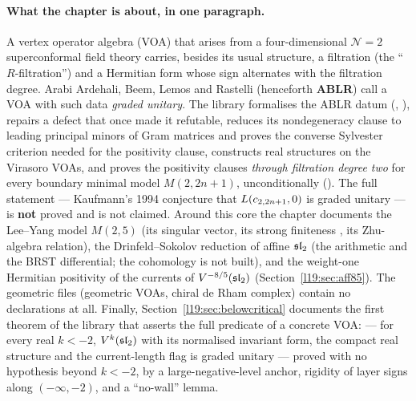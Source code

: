 \paragraph{What the chapter is about, in one paragraph.} A vertex operator algebra (VOA) that
arises from a four-dimensional $\mathcal N=2$ superconformal field theory carries, besides its
usual structure, a filtration (the ``$R$-filtration'') and a Hermitian form whose sign alternates
with the filtration degree. Arabi Ardehali, Beem, Lemos and Rastelli (henceforth \textbf{ABLR})
call a VOA with such data \emph{graded unitary}. The library formalises the ABLR datum
(, ), repairs a defect that once made it refutable,
reduces its nondegeneracy clause to leading principal minors of Gram matrices and proves the
converse Sylvester criterion needed for the positivity clause, constructs real structures on the
Virasoro VOAs, and proves the positivity clauses \emph{through filtration degree two} for every
boundary minimal model $M(2,2n+1)$, unconditionally
(\allowbreak{}). The full statement --- Kaufmann's 1994 conjecture that
$L(c_{2,2n+1},0)$ is graded unitary --- is \textbf{not} proved and is not claimed. Around this core
the chapter documents the Lee--Yang model $M(2,5)$ (its singular vector, its strong finiteness
, its Zhu-algebra relation), the Drinfeld--Sokolov reduction of
affine $\mathfrak{sl}_2$ (the arithmetic and the BRST differential; the cohomology is not built), and
the weight-one Hermitian positivity of the currents of $V^{-8/5}(\mathfrak{sl}_2)$ (Section~\ref{l19:sec:aff85}).
The geometric files (geometric VOAs,
chiral de Rham complex) contain no declarations at all. Finally, Section~\ref{l19:sec:belowcritical} documents the
first theorem of the library that asserts the full predicate  of a concrete VOA:
\allowbreak{}\allowbreak{}\allowbreak{} --- for every real $k<-2$,
$V^k(\mathfrak{sl}_2)$ with its normalised invariant form, the compact real structure and the current-length flag is
graded unitary --- proved with no hypothesis beyond $k<-2$, by a large-negative-level anchor, rigidity of layer
signs along $(-\infty,-2)$, and a ``no-wall'' lemma.

